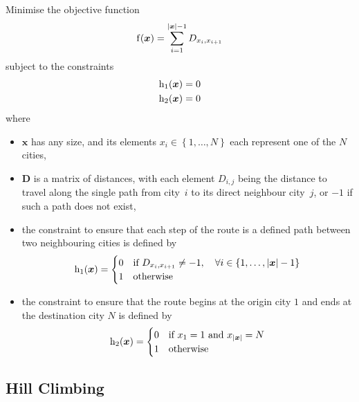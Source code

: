 Minimise the objective function
\begin{equation*}
  \function{f}{\boldsymbol{x}} = \sum_{i=1}^{\left\lvert \boldsymbol{x} \right\rvert - 1} D_{x_{i},x_{i+1}}
\end{equation*}
subject to the constraints
\begin{gather*}
  \function[_{1}]{h}{\boldsymbol{x}} = 0 \\
  \function[_{2}]{h}{\boldsymbol{x}} = 0
\end{gather*}
where
\begin{itemize}
  \item \( \boldsymbol{x} \) has any size, and its elements \( x_{i} \in \left\{ 1, \ldots, N \right\} \) each represent one of the \( N \) cities,
  \item \( \mathbf{D} \) is a matrix of distances, with each element \( D_{i,j} \) being the distance to travel along the single path from city~\( i \) to its direct neighbour city~\( j \), or \( -1 \) if such a path does not exist,
  \item the constraint to ensure that each step of the route is a defined path between two neighbouring cities is defined by
  \begin{equation*}
    \function[_{1}]{h}{\boldsymbol{x}} = \begin{cases}
      0 & \text{if } D_{x_{i},x_{i+1}} \not= -1, \quad \forall i \in \left\{ 1, \ldots, \left\lvert \boldsymbol{x} \right\rvert - 1 \right\} \\
      1 & \text{otherwise}
    \end{cases}
  \end{equation*}
  \item the constraint to ensure that the route begins at the origin city \( 1 \) and ends at the destination city \( N \) is defined by
  \begin{equation*}
    \function[_{2}]{h}{\boldsymbol{x}} = \begin{cases}
      0 & \text{if } x_{1} = 1 \text{ and } x_{\left\lvert \boldsymbol{x} \right\rvert} = N \\
      1 & \text{otherwise}
    \end{cases}
  \end{equation*}
\end{itemize}

\subsection{Hill Climbing}

